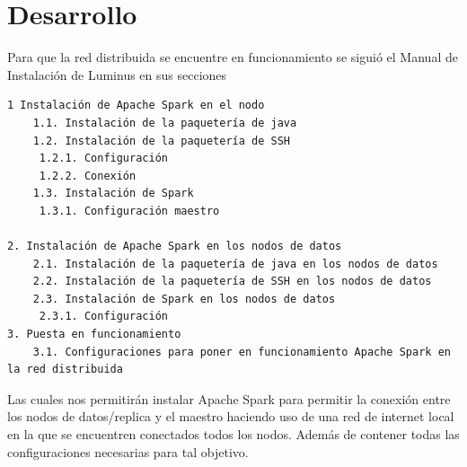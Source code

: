 \section{Desarrollo}
Para que la red distribuida se encuentre en funcionamiento se siguió el Manual de Instalación de Luminus 
en sus secciones 
\begin{verbatim}
1 Instalación de Apache Spark en el nodo
	1.1. Instalación de la paquetería de java 
	1.2. Instalación de la paquetería de SSH	
	 1.2.1. Configuración
	 1.2.2. Conexión
	1.3. Instalación de Spark
     1.3.1. Configuración maestro

2. Instalación de Apache Spark en los nodos de datos
	2.1. Instalación de la paquetería de java en los nodos de datos
	2.2. Instalación de la paquetería de SSH en los nodos de datos
	2.3. Instalación de Spark en los nodos de datos
     2.3.1. Configuración 
3. Puesta en funcionamiento
	3.1. Configuraciones para poner en funcionamiento Apache Spark en la red distribuida
\end{verbatim}
Las cuales nos permitirán instalar Apache Spark para permitir la conexión entre los nodos de datos/replica y el maestro haciendo uso de una red de internet local en la que se encuentren conectados todos los nodos.
Además de contener todas las configuraciones necesarias para tal objetivo.  
